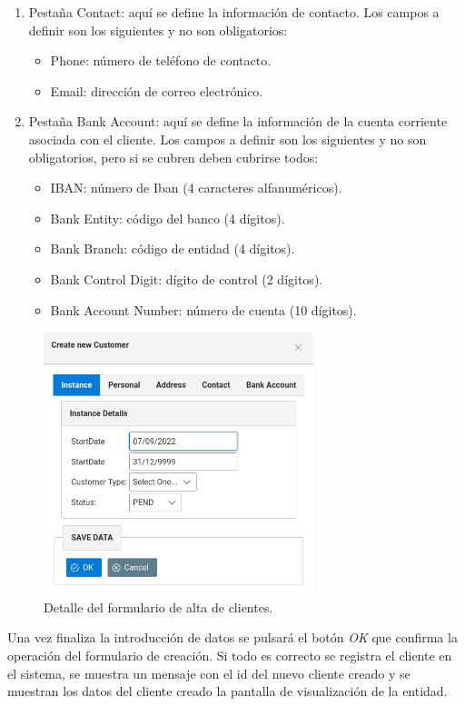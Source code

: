 \begin{enumerate}
\item Pestaña Contact: aquí se define la información de contacto. Los campos a definir son los siguientes y no son obligatorios:
	\begin{itemize}
	\item Phone: número de teléfono de contacto.
	\item Email: dirección de correo electrónico.
	\end{itemize}
\item Pestaña Bank Account: aquí se define la información de la cuenta corriente asociada con el cliente. Los campos a definir son los siguientes y no son obligatorios, pero si se cubren deben cubrirse todos:
	\begin{itemize}
	\item IBAN: número de Iban (4 caracteres alfanuméricos).
	\item Bank Entity: código del banco (4 dígitos).
	\item Bank Branch: código de entidad (4 dígitos).
	\item Bank Control Digit: dígito de control (2 dígitos).
	\item Bank Account Number: número de cuenta (10 dígitos).	
	\end{itemize}	
\end{enumerate}


\begin{figure}[H]
  \centering
  \includegraphics[width=0.70\textwidth]{imaxes/formulario-alta-cliente.png}
  \caption{Detalle del formulario de alta de clientes.}
  \label{fig:formulario-alta-cliente}
\end{figure}

Una vez finaliza la introducción de datos se pulsará el botón \emph{OK} que confirma la operación del formulario de creación. Si todo es correcto se registra el cliente en el sistema, se muestra un mensaje con el id del nuevo cliente creado y se muestran los datos del cliente creado la pantalla de visualización de la entidad.


